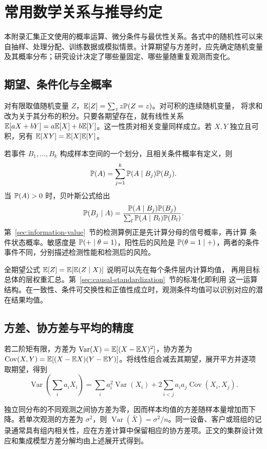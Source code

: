 \chapter{常用数学关系与推导约定}
\label{app:mathematics}

本附录汇集正文使用的概率运算、微分条件与最优性关系。各式中的随机性可以来自抽样、处理分配、训练数据或模拟情景。计算期望与方差时，应先确定随机变量及其概率分布；研究设计决定了哪些量固定、哪些量随重复观测而变化。

\section{期望、条件化与全概率}
对有限取值随机变量 \(Z\)，\(\mathbb E[Z]=\sum_z z\mathbb P(Z=z)\)。对可积的连续随机变量，
将求和改为关于其分布的积分。只要各期望存在，就有线性关系
\(\mathbb E[aX+bY]=a\mathbb E[X]+b\mathbb E[Y]\)。这一性质对相关变量同样成立。若 \(X,Y\) 独立且可积，另有 \(\mathbb E[XY]=\mathbb E[X]\mathbb E[Y]\)。

若事件 \(B_1,\ldots,B_k\) 构成样本空间的一个划分，且相关条件概率有定义，则
\[
\mathbb P(A)=\sum_{j=1}^k\mathbb P(A\mid B_j)\mathbb P(B_j).
\]
当 \(\mathbb P(A)>0\) 时，贝叶斯公式给出
\[
\mathbb P(B_j\mid A)=
\frac{\mathbb P(A\mid B_j)\mathbb P(B_j)}{\sum_l\mathbb P(A\mid B_l)\mathbb P(B_l)}.
\]
第~\ref{sec:information-value}~节的检测算例正是先计算分母的信号概率，再计算
条件状态概率。敏感度是 \(\mathbb P(+\mid\theta=1)\)，阳性后的风险是
\(\mathbb P(\theta=1\mid+)\)，两者的条件事件不同，分别描述检测性能和检测后的风险。

全期望公式 \(\mathbb E[Z]=\mathbb E[\mathbb E(Z\mid X)]\) 说明可以先在每个条件层内计算均值，
再用目标总体的层权重汇总。第~\ref{sec:causal-standardization}~节的标准化即利用
这一运算结构。在一致性、条件可交换性和正值性成立时，观测条件均值可以识别对应的潜在结果均值。

\section{方差、协方差与平均的精度}

若二阶矩有限，方差为 \(\operatorname{Var}(X)=\mathbb E[(X-\mathbb E X)^2]\)，协方差为 \(\operatorname{Cov}(X,Y)=\mathbb E[(X-\mathbb E X)(Y-\mathbb E Y)]\)。将线性组合减去其期望，展开平方并逐项取期望，得到
\[
\operatorname{Var}\!\left(\sum_i a_iX_i\right)
=\sum_i a_i^2\operatorname{Var}(X_i)
+2\sum_{i<j}a_ia_j\operatorname{Cov}(X_i,X_j).
\]

独立同分布的不同观测之间协方差为零，因而样本均值的方差随样本量增加而下降。若单次观测的方差为 \(\sigma^2\)，则 \(\operatorname{Var}(\bar X)=\sigma^2/n\)。同一设备、客户或班组的记录通常具有组内相关性，应在方差计算中保留相应的协方差项。正文的集群设计效应和集成模型方差分解均由上述展开式得到。

